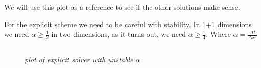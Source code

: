 \documentclass[english,a4paper,12pt]{article}
\begin{document}
We will use this plot as a reference to see if the other solutions make sense.

For the explicit scheme we need to be careful with stability. In 1+1 dimensions we need $\alpha \geq \frac{1}{2}$ in two dimensions,
as it turns out, we need $\alpha \geq \frac{1}{4}$. Where $\alpha = \frac{\Delta t}{\Delta x^2}$
\subsection*{}
\begin{figure}[H]
 \begin{center}
 \end{center}
 \caption{\textit{plot of explicit solver with unstable $\alpha$}}
 \label{fig:edge}
\end{figure}
\end{document}
